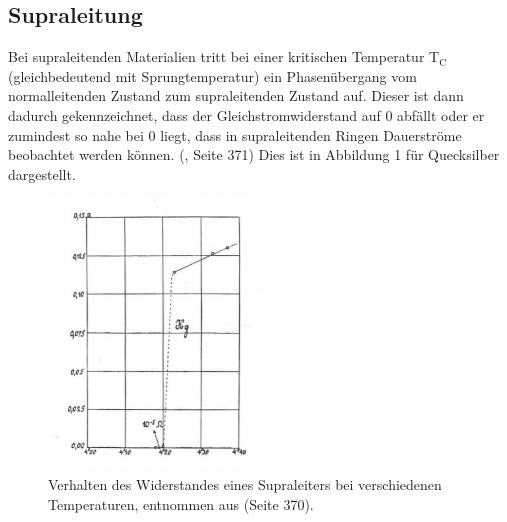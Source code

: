 \documentclass[german,  %
parskip=full,  %
]{scrartcl}
\begin{document}
\subsection{Supraleitung}
Bei supraleitenden Materialien tritt bei einer kritischen Temperatur T$_{\text{C}}$ (gleichbedeutend mit Sprungtemperatur) ein Phasenübergang vom normalleitenden Zustand zum supraleitenden Zustand auf. Dieser ist dann  dadurch gekennzeichnet, dass der Gleichstromwiderstand auf $0$ abfällt oder er zumindest so nahe bei $0$ liegt, dass in supraleitenden Ringen Dauerströme beobachtet werden können. (\cite{5}, Seite 371)
\newpage
Dies ist in Abbildung 1 für Quecksilber dargestellt.
\\
\begin{figure}[h!]
\centering
\includegraphics[width=0.5\textwidth]{hg}
\caption{Verhalten des Widerstandes eines Supraleiters bei verschiedenen Temperaturen, entnommen aus \cite{5} (Seite 370).}
\end{figure}
\end{document}
